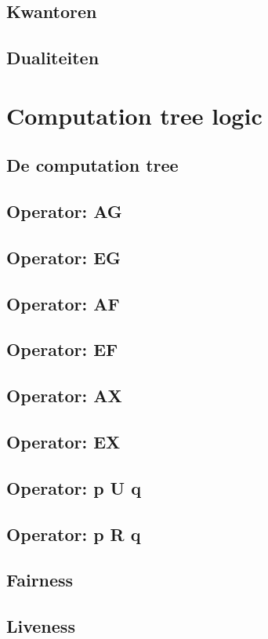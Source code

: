 \documentclass{article}
\begin{document}
\subsection{Kwantoren}

\subsection{Dualiteiten}

\section{Computation tree logic}

\subsection{De computation tree}

\subsection{Operator: AG}

\subsection{Operator: EG}

\subsection{Operator: AF}

\subsection{Operator: EF}

\subsection{Operator: AX}

\subsection{Operator: EX}

\subsection{Operator: p U q}

\subsection{Operator: p R q}

\subsection{Fairness}

\subsection{Liveness}

\newpage

\newpage


\end{document}
